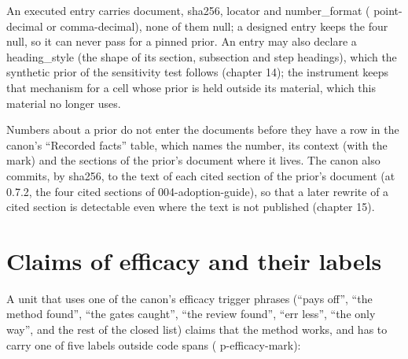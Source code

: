 \documentclass[
  american,
  10pt,
]{report}
\newcounter{none} %
\renewcommand{\texttt}[1]{{\ttfamily\hyphenchar\font=-1 #1}}
\begin{document}
An executed entry carries \texttt{document}, \texttt{sha256},
\texttt{locator} and \texttt{number\_\allowbreak{}format}
(\texttt{point-\allowbreak{}decimal} or
\texttt{comma-\allowbreak{}decimal}), none of them null; a designed
entry keeps the four null, so it can never pass for a pinned prior. An
entry may also declare a \texttt{heading\_\allowbreak{}style} (the shape
of its section, subsection and step headings), which the synthetic prior
of the sensitivity test follows (chapter 14); the instrument keeps that
mechanism for a cell whose prior is held outside its material, which
this material no longer uses.

Numbers about a prior do not enter the documents before they have a row
in the canon's ``Recorded facts'' table, which names the number, its
context (with the mark) and the sections of the prior's document where
it lives. The canon also commits, by sha256, to the text of each cited
section of the prior's document (at 0.7.2, the four cited sections of
\texttt{004-\allowbreak{}adoption-\allowbreak{}guide}), so that a later
rewrite of a cited section is detectable even where the text is not
published (chapter 15).

\section{Claims of efficacy and their
labels}\label{claims-of-efficacy-and-their-labels}

A unit that uses one of the canon's efficacy trigger phrases (``pays
off'', ``the method found'', ``the gates caught'', ``the review found'',
``err less'', ``the only way'', and the rest of the closed list) claims
that the method works, and has to carry one of five labels outside code
spans (\texttt{p-\allowbreak{}efficacy-\allowbreak{}mark}):
\end{document}
